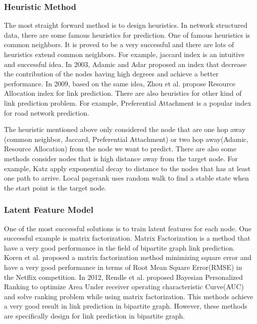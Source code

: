 \documentclass[paper=letter, fontsize=12pt]{scrartcl} %
\begin{document}
	\subsubsection{Heuristic Method}
	The most straight forward method is to design heuristics.
	In network structured data, there are some famous heuristics for prediction. One of famous heuristics is common neighbors. It is proved to be a very successful and there are lots of heuristics extend common neighbors. For example, jaccard index is an intuitive and successful idea. In 2003, Adamic and Adar \cite{adar} proposed an index that decrease the contribution of the nodes having high degrees and achieve a better performance. In 2009, based on the same idea, Zhou et al. \cite{ra} propose Resource Allocation index for link prediction. There are also heuristics for other kind of link prediction problem. For example, Preferential Attachment \cite{pa} is a popular index for road network prediction.
	
	The heuristic mentioned above only considered the node that are one hop away (common neighbor, Jaccard, Preferential Attachment) or two hop away(Adamic, Resource Allocation) from the node we want to predict. There are also some methods consider nodes that is high distance away from the target node. For example, Katz \cite{katz} apply exponential decay to distance to the nodes that has at least one path to arrive. Local pagerank uses random walk to find a stable state when the start point is the target node.  
	
	\subsubsection {Latent Feature Model}
	One of the most successful solutions is to train latent features for each node. One successful example is matrix factorization. Matrix Factorization is a method that have a very good performance in the field of bipartite graph link prediction. Koren et al. proposed a matrix factorization \cite{mf} method minimizing square error and have a very good performance in terms of Root Mean Square Error(RMSE) in the Netflix competition. In 2012, Rendle et al. \cite{bprmf} proposed Bayesian Personalized Ranking to optimize Area Under receiver operating characteristic Curve(AUC) and solve ranking problem while using matrix factorization. This methods achieve a very good result in link prediction in bipartite graph. However, these methods are specifically design for link prediction in bipartite graph. 
	
\end{document}
